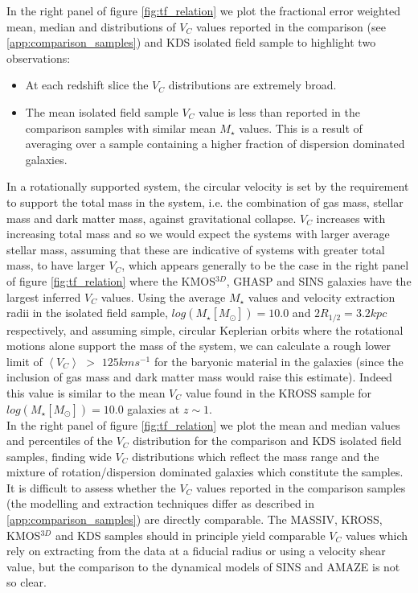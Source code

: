 \documentclass[fleqn,usenatbib]{mn2e}
\begin{document}
In the right panel of figure \ref{fig:tf_relation} we plot the fractional error weighted mean, median and distributions of $V_{C}$ values reported in the comparison (see \cref{app:comparison_samples}) and KDS isolated field sample to highlight two observations:
\begin{itemize}
    \item At each redshift slice the $V_{C}$ distributions are extremely broad.
    \item The mean isolated field sample $V_{C}$ value is less than reported in the comparison samples with similar mean $M_{\star}$ values.
    This is a result of averaging over a sample containing a higher fraction of dispersion dominated galaxies.
\end{itemize}

In a rotationally supported system, the circular velocity is set by the requirement to support the total mass in the system, i.e. the combination of gas mass, stellar mass and dark matter mass, against gravitational collapse.
$V_{C}$ increases with increasing total mass and so we would expect the systems with larger average stellar mass, assuming that these are indicative of systems with greater total mass, to have larger $V_{C}$, which appears generally to be the case in the right panel of figure \ref{fig:tf_relation} where the KMOS$^{3D}$, GHASP and SINS galaxies have the largest inferred $V_{C}$ values.
Using the average $M_{\star}$ values and velocity extraction radii in the isolated field sample, $log(M_{\star}[M_{\odot}])=10.0$ and $2R_{1/2} = 3.2kpc$ respectively, and assuming simple, circular Keplerian orbits where the rotational motions alone support the mass of the system, we can calculate a rough lower limit of $\left<V_{C}\right>$ $>$ $125kms^{-1}$ for the baryonic material in the galaxies (since the inclusion of gas mass and dark matter mass would raise this estimate).
Indeed this value is similar to the mean $V_{C}$ value found in the KROSS sample for $log(M_{\star}[M_{\odot}])=10.0$ galaxies at $z\sim1$. \\

In the right panel of figure \ref{fig:tf_relation} we plot the mean and median values and percentiles of the $V_{C}$ distribution for the comparison and KDS isolated field samples, finding wide $V_{C}$ distributions which reflect the mass range and the mixture of rotation/dispersion dominated galaxies which constitute the samples.
It is difficult to assess whether the $V_{C}$ values reported in the comparison samples (the modelling and extraction techniques differ as described in \cref{app:comparison_samples}) are directly comparable.
The MASSIV, KROSS, KMOS$^{3D}$ and KDS samples should in principle yield comparable $V_{C}$ values which rely on extracting from the data at a fiducial radius or using a velocity shear value, but the comparison to the dynamical models of SINS and AMAZE is not so clear. \\
\end{document}
